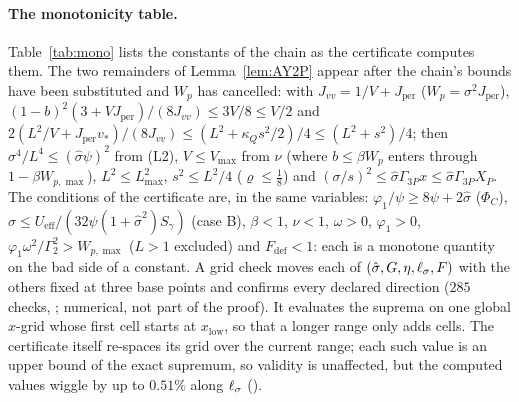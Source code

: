 \paragraph*{The monotonicity table.}
Table~\ref{tab:mono} lists the constants of the chain as the certificate computes them. The two remainders of Lemma~\ref{lem:AY2P} appear after the
chain's bounds have been substituted and $W_p$ has cancelled: with $J_{vv}=1/V+J_{\mathrm{per}}$ ($W_p=\sigma^2J_{\mathrm{per}}$),
$(1-b)^2(3+VJ_{\mathrm{per}})/(8J_{vv})\le3V/8\le V/2$ and $2(L^2/V+J_{\mathrm{per}}v_*)/(8J_{vv})\le(L^2+\kappa_Qs^2/2)/4\le(L^2+s^2)/4$; then
$\sigma^4/L^4\le(\hat\sigma\psi)^2$ from (L2), $V\le V_{\max}$ from $\nu$ (where $b\le\beta W_p$ enters through $1-\beta W_{p,\max}$), $L^2\le L^2_{\max}$,
$s^2\le L^2/4$ ($\varrho\le\tfrac18$) and $(\sigma/s)^2\le\hat\sigma\Gamma_{3P}x\le\hat\sigma\Gamma_{3P}X_P$. The conditions of the certificate are, in the same
variables: $\varphi_1/\psi\ge8\psi+2\hat\sigma$ ($\Phi_C$), $\hat\sigma\le U_{\mathrm{eff}}/(32\psi(1+\hat\sigma^2)S_\gamma)$ (case B), $\beta<1$, $\nu<1$, $\omega>0$,
$\varphi_1>0$, $\varphi_1\omega^2/\Gamma_2^2>W_{p,\max}$ ($L>1$ excluded) and $F_{\mathrm{def}}<1$: each is a monotone quantity on the bad side of a constant.
A grid check moves each of $(\hat\sigma,G,\eta,\ell_\sigma,F)$ with the others fixed at three base points and confirms every declared direction ($285$ checks,
; numerical, not part of the proof). It evaluates the suprema on one global $x$-grid whose first cell starts at
$x_{\mathrm{low}}$, so that a longer range only adds cells. The certificate itself re-spaces its grid over the current range; each such value is an upper
bound of the exact supremum, so validity is unaffected, but the computed values wiggle by up to $0.51\%$ along $\ell_\sigma$ ().

